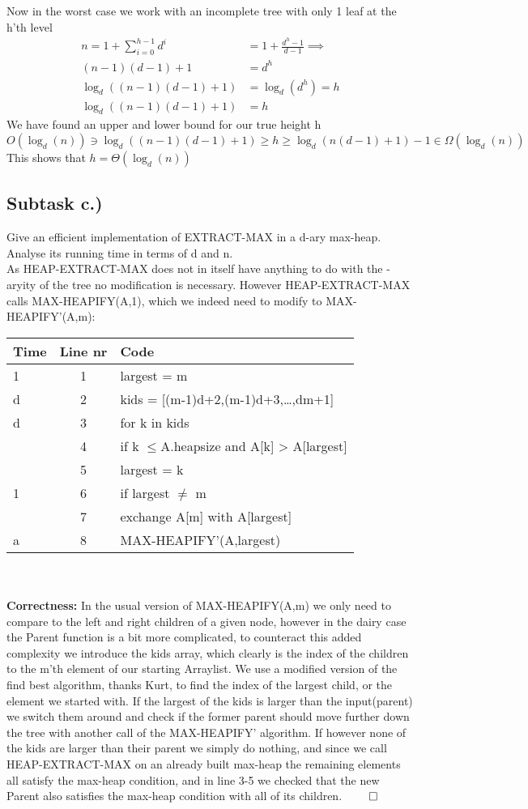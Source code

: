 \documentclass{article}
\theoremstyle{remark}
\numberwithin{equation}{section}
\begin{document}
Now in the worst case we work with an incomplete tree with only 1 leaf at the h'th level 
\begin{align*}
n =1+ \sum_{i=0}^{h-1} d^i &= 1+\frac{d^{h}-1}{d-1} \implies\\
(n-1)(d-1)+1 &= d^{h}\\
\log_d((n-1)(d-1)+1) &= \log_d(d^{h}) = h\\
\log_d((n-1)(d-1)+1) &= h
\end{align*}
We have found an upper and lower bound for our true height h
\begin{equation}
	O(\log_d(n))\ni\log_d((n-1)(d-1)+1) \geq h \geq \log_d(n(d-1)+1)-1\in\Omega(\log_d(n))
\end{equation}
This shows that $h = \Theta(\log_d(n))$
\newpage\subsection{Subtask c.)} Give an efficient implementation of EXTRACT-MAX in a d-ary max-heap. Analyse its running time in terms of d and n.
\\As HEAP-EXTRACT-MAX does not in itself have anything to do with the -aryity of the tree no modification is necessary. However HEAP-EXTRACT-MAX calls MAX-HEAPIFY(A,1), which we indeed need to modify to MAX-HEAPIFY'(A,m):
\\\begin{tabular}{l | c | l} 
	Time & Line nr & Code \\ \hline
	1 & 1 & largest = m \\
	d & 2 & kids = [(m-1)d+2,(m-1)d+3,\dots,dm+1] \\
	d & 3 & for k in kids \\
	\indent 2 & 4 & \indent if k $\leq $A.heapsize and A[k] > A[largest] \\
	\indent\indent 1 & 5 & \indent\indent largest = k \\
	1 & 6 & if largest $\neq$ m \\
	\indent3 & 7 & \indent exchange A[m] with A[largest] \\
	a & 8 & \indent MAX-HEAPIFY'(A,largest)
\end{tabular}\\\\
\textbf{Correctness:} In the usual version of MAX-HEAPIFY(A,m) we only need to compare to the left and right children of a given node, however in the dairy case the Parent function is a bit more complicated, to counteract this added complexity we introduce the kids array, which clearly is the index of the children to the m'th element of our starting Arraylist. We use a modified version of the find best algorithm, thanks Kurt, to find the index of the largest child, or the element we started with. If the largest of the kids is larger than the input(parent) we switch them around and check if the former parent should move further down the tree with another call of the MAX-HEAPIFY' algorithm. If however none of the kids are larger than their parent we simply do nothing, and since we call HEAP-EXTRACT-MAX on an already built max-heap the remaining elements all satisfy the max-heap condition, and in line 3-5 we checked that the new Parent also satisfies the max-heap condition with all of its children. $\qed$
\end{document}
